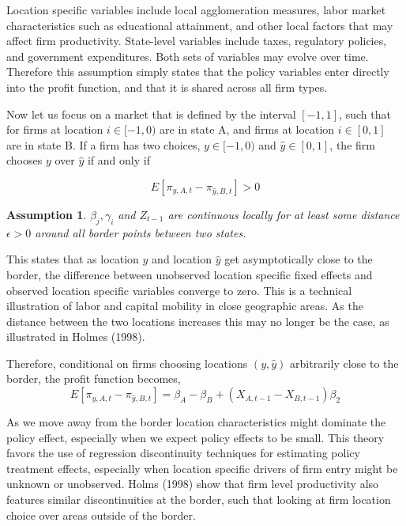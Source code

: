 \documentclass[12pt,a4paper]{article}
\newtheorem{assumption}[theorem]{Assumption}
\begin{document}
Location specific variables include local agglomeration measures, labor market characteristics such as educational attainment, and other local factors that may affect firm productivity. State-level variables include taxes, regulatory policies, and government expenditures. Both sets of variables may evolve over time. Therefore this assumption simply states that the policy variables enter directly into the profit function, and that it is shared across all firm types. 

Now let us focus on a market that is defined by the interval $[-1,1]$, such that for firms at location $i \in [-1,0)$ are in state A, and firms at location $i \in [0,1]$ are in state B. If a firm has two choices,  $y \in [-1,0)$ and $\hat y \in [0,1]$, the firm chooses $y$ over $\hat y$ if and only if 

\begin{equation}\label{diff}
E[\pi_{y,A,t}-\pi_{\hat y,B,t}] > 0
\end{equation}

\begin{assumption}\label{cont}
$\beta_{j}, \gamma_{i}$ and $Z_{t-1}$ are continuous locally for at least some distance $\epsilon > 0$ around all border points between two states.
\end{assumption}

This states that as location $y$ and location $\hat y$  get asymptotically close to the border, the difference between unobserved location specific fixed effects and observed location specific variables converge to zero. This is a technical illustration of labor and capital mobility in close geographic areas. As the distance between the two locations increases this may no longer be the case, as illustrated in Holmes (1998). 

Therefore, conditional on firms choosing locations $(y,\hat y)$ arbitrarily close to the border, the profit function becomes,
\begin{equation}\label{prof}
E[\pi_{y,A,t}-\pi_{\hat y, B, t}] =  \beta_{A}-\beta_{B}+(X_{A,t-1}-X_{B,t-1})\beta_{2}
\end{equation}

As we move away from the border location characteristics might dominate the policy effect, especially when we expect policy effects to be small. This theory favors the use of regression discontinuity techniques for estimating policy treatment effects, especially when location specific drivers of firm entry might be unknown or unobserved. Holms (1998) show that firm level productivity also features similar discontinuities at the border, such that looking at firm location choice over areas outside of the border.
\end{document}
